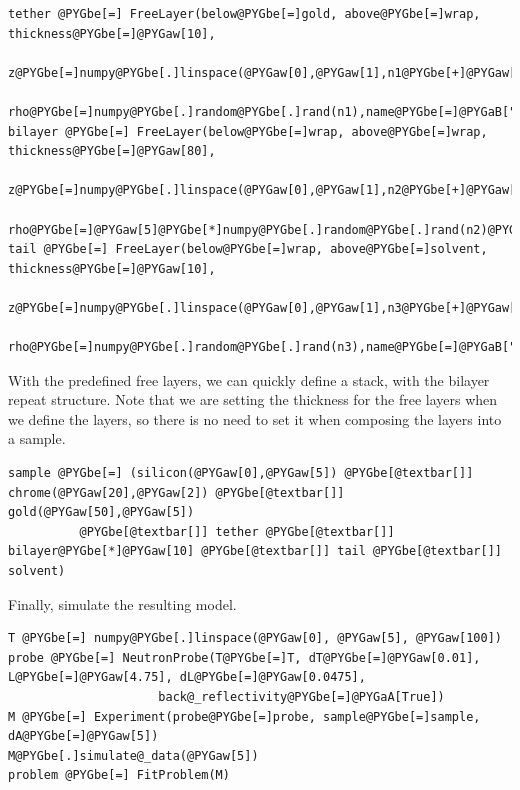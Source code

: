 \documentclass[letterpaper,10pt,english]{sphinxmanual}
\begin{document}
\begin{Verbatim}[commandchars=@\[\]]
tether @PYGbe[=] FreeLayer(below@PYGbe[=]gold, above@PYGbe[=]wrap, thickness@PYGbe[=]@PYGaw[10],
                   z@PYGbe[=]numpy@PYGbe[.]linspace(@PYGaw[0],@PYGaw[1],n1@PYGbe[+]@PYGaw[2])@PYGZlb[]@PYGaw[1]:@PYGbe[-]@PYGaw[1]@PYGZrb[],
                   rho@PYGbe[=]numpy@PYGbe[.]random@PYGbe[.]rand(n1),name@PYGbe[=]@PYGaB["]@PYGaB[tether]@PYGaB["])
bilayer @PYGbe[=] FreeLayer(below@PYGbe[=]wrap, above@PYGbe[=]wrap, thickness@PYGbe[=]@PYGaw[80],
                    z@PYGbe[=]numpy@PYGbe[.]linspace(@PYGaw[0],@PYGaw[1],n2@PYGbe[+]@PYGaw[2])@PYGZlb[]@PYGaw[1]:@PYGbe[-]@PYGaw[1]@PYGZrb[],
                    rho@PYGbe[=]@PYGaw[5]@PYGbe[*]numpy@PYGbe[.]random@PYGbe[.]rand(n2)@PYGbe[-]@PYGaw[1],name@PYGbe[=]@PYGaB["]@PYGaB[bilayer]@PYGaB["])
tail @PYGbe[=] FreeLayer(below@PYGbe[=]wrap, above@PYGbe[=]solvent, thickness@PYGbe[=]@PYGaw[10],
                   z@PYGbe[=]numpy@PYGbe[.]linspace(@PYGaw[0],@PYGaw[1],n3@PYGbe[+]@PYGaw[2])@PYGZlb[]@PYGaw[1]:@PYGbe[-]@PYGaw[1]@PYGZrb[],
                   rho@PYGbe[=]numpy@PYGbe[.]random@PYGbe[.]rand(n3),name@PYGbe[=]@PYGaB["]@PYGaB[tail]@PYGaB["])
\end{Verbatim}

With the predefined free layers, we can quickly define a stack, with
the bilayer repeat structure.  Note that we are setting the thickness
for the free layers when we define the layers, so there is no need to
set it when composing the layers into a sample.

\begin{Verbatim}[commandchars=@\[\]]
sample @PYGbe[=] (silicon(@PYGaw[0],@PYGaw[5]) @PYGbe[@textbar[]] chrome(@PYGaw[20],@PYGaw[2]) @PYGbe[@textbar[]] gold(@PYGaw[50],@PYGaw[5])
          @PYGbe[@textbar[]] tether @PYGbe[@textbar[]] bilayer@PYGbe[*]@PYGaw[10] @PYGbe[@textbar[]] tail @PYGbe[@textbar[]] solvent)
\end{Verbatim}

Finally, simulate the resulting model.

\begin{Verbatim}[commandchars=@\[\]]
T @PYGbe[=] numpy@PYGbe[.]linspace(@PYGaw[0], @PYGaw[5], @PYGaw[100])
probe @PYGbe[=] NeutronProbe(T@PYGbe[=]T, dT@PYGbe[=]@PYGaw[0.01], L@PYGbe[=]@PYGaw[4.75], dL@PYGbe[=]@PYGaw[0.0475],
                     back@_reflectivity@PYGbe[=]@PYGaA[True])
M @PYGbe[=] Experiment(probe@PYGbe[=]probe, sample@PYGbe[=]sample, dA@PYGbe[=]@PYGaw[5])
M@PYGbe[.]simulate@_data(@PYGaw[5])
problem @PYGbe[=] FitProblem(M)
\end{Verbatim}
\end{document}

